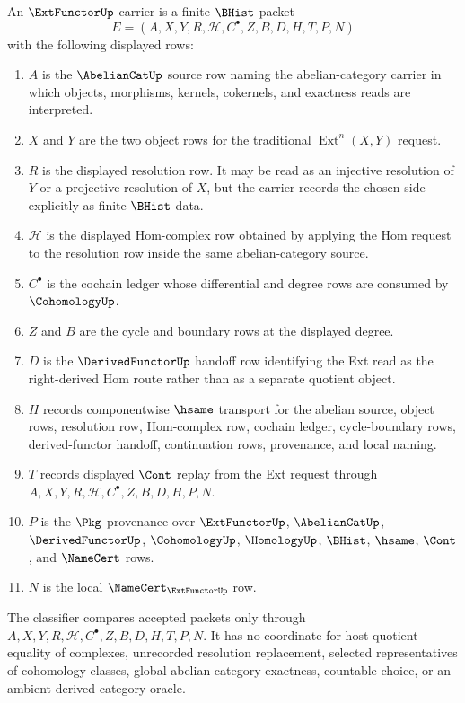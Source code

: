 \begin{definition}
\label{def:ext-functor-carrier}
An $\ExtFunctorUp$ carrier is a finite $\BHist$ packet
$$
E=(A,X,Y,R,\mathcal{H},C^\bullet,Z,B,D,H,T,P,N)
$$
with the following displayed rows:
\begin{enumerate}
\item $A$ is the $\AbelianCatUp$ source row naming the abelian-category carrier in which objects, morphisms, kernels, cokernels, and exactness reads are interpreted.
\item $X$ and $Y$ are the two object rows for the traditional $\operatorname{Ext}^n(X,Y)$ request.
\item $R$ is the displayed resolution row. It may be read as an injective resolution of $Y$ or a projective resolution of $X$, but the carrier records the chosen side explicitly as finite $\BHist$ data.
\item $\mathcal{H}$ is the displayed Hom-complex row obtained by applying the Hom request to the resolution row inside the same abelian-category source.
\item $C^\bullet$ is the cochain ledger whose differential and degree rows are consumed by $\CohomologyUp$.
\item $Z$ and $B$ are the cycle and boundary rows at the displayed degree.
\item $D$ is the $\DerivedFunctorUp$ handoff row identifying the Ext read as the right-derived Hom route rather than as a separate quotient object.
\item $H$ records componentwise $\hsame$ transport for the abelian source, object rows, resolution row, Hom-complex row, cochain ledger, cycle-boundary rows, derived-functor handoff, continuation rows, provenance, and local naming.
\item $T$ records displayed $\Cont$ replay from the Ext request through $A,X,Y,R,\mathcal{H},C^\bullet,Z,B,D,H,P,N$.
\item $P$ is the $\Pkg$ provenance over $\ExtFunctorUp$, $\AbelianCatUp$, $\DerivedFunctorUp$, $\CohomologyUp$, $\HomologyUp$, $\BHist$, $\hsame$, $\Cont$, and $\NameCert$ rows.
\item $N$ is the local $\NameCert_{\ExtFunctorUp}$ row.
\end{enumerate}
The classifier compares accepted packets only through $A,X,Y,R,\mathcal{H},C^\bullet,Z,B,D,H,T,P,N$. It has no coordinate for host quotient equality of complexes, unrecorded resolution replacement, selected representatives of cohomology classes, global abelian-category exactness, countable choice, or an ambient derived-category oracle.
\end{definition}

